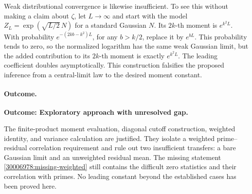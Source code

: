\documentclass[11pt,a4paper]{article}
\numberwithin{equation}{section}
\begin{document}
Weak distributional convergence is likewise insufficient. To see this
without making a claim about $\zeta$, let $L\to\infty$ and start with the
model $Z_L=\exp(\sqrt{L/2}\,N)$ for a standard Gaussian $N$.
Its $2k$-th moment is $e^{k^2L}$. With probability
$e^{-(2kb-k^2)L}$, for any $b>k/2$, replace it by $e^{bL}$.
This probability tends to zero, so the normalized logarithm has the same
weak Gaussian limit, but the added contribution to its $2k$-th moment
is exactly $e^{k^2L}$. The leading coefficient doubles asymptotically.
This construction falsifies the proposed inference from a central-limit
law to the desired moment constant.

\paragraph{Outcome.}
\textbf{Outcome: Exploratory approach with unresolved gap.}

The finite-product moment evaluation, diagonal cutoff construction,
weighted identity, and variance calculation are justified. They isolate
a weighted prime--residual correlation requirement and rule out two
insufficient transfers: a bare Gaussian limit and an unweighted residual
mean. The missing statement \eqref{30006978:missing-weighted} still contains
the difficult zero statistics and their correlation with primes. No
leading constant beyond the established cases has been proved here.
\end{document}
